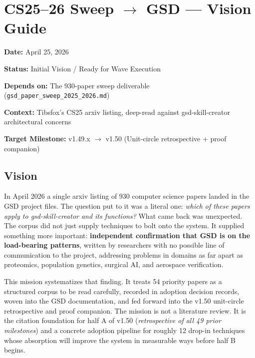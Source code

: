 \documentclass[11pt,letterpaper]{article}
\newcommand{\stageheader}[2]{%
  \noindent\colorbox{#2}{\makebox[\textwidth][l]{%
    \textcolor{white}{\bfseries\sffamily\hspace{6pt}#1\hspace{6pt}}}}%
  \vspace{0.5em}\par%
}
\newcommand{\metafield}[2]{\textbf{\sffamily #1} #2\par}
\begin{document}
{\hypersetup{linkcolor=primary}
\tableofcontents}
\newpage

\stageheader{STAGE 1 --- VISION DOCUMENT}{primary}

\section{CS25--26 Sweep $\rightarrow$ GSD --- Vision Guide}

\metafield{Date:}{April 25, 2026}
\metafield{Status:}{Initial Vision / Ready for Wave Execution}
\metafield{Depends on:}{The 930-paper sweep deliverable (\texttt{gsd\_paper\_sweep\_2025\_2026.md})}
\metafield{Context:}{Tibsfox's CS25 arxiv listing, deep-read against gsd-skill-creator architectural concerns}
\metafield{Target Milestone:}{v1.49.x $\rightarrow$ v1.50 (Unit-circle retrospective + proof companion)}

\subsection{Vision}

In April 2026 a single arxiv listing of 930 computer science papers landed in the GSD project files. The question put to it was a literal one: \textit{which of these papers apply to gsd-skill-creator and its functions?} What came back was unexpected. The corpus did not just supply techniques to bolt onto the system. It supplied something more important: \textbf{independent confirmation that GSD is on the load-bearing patterns}, written by researchers with no possible line of communication to the project, addressing problems in domains as far apart as proteomics, population genetics, surgical AI, and aerospace verification.

This mission systematizes that finding. It treats 54 priority papers as a structured corpus to be read carefully, recorded in adoption decision records, woven into the GSD documentation, and fed forward into the v1.50 unit-circle retrospective and proof companion. The mission is not a literature review. It is the citation foundation for half A of v1.50 (\textit{retrospective of all 49 prior milestones}) and a concrete adoption pipeline for roughly 12 drop-in techniques whose absorption will improve the system in measurable ways before half B begins.
\end{document}
